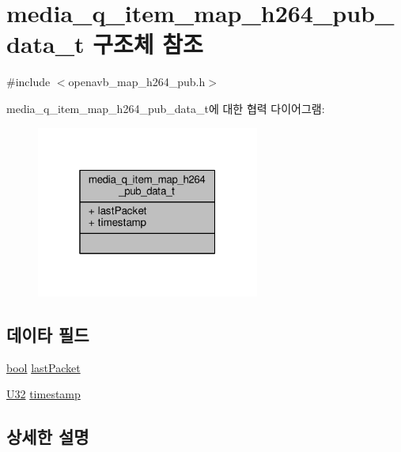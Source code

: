 \hypertarget{structmedia__q__item__map__h264__pub__data__t}{}\section{media\+\_\+q\+\_\+item\+\_\+map\+\_\+h264\+\_\+pub\+\_\+data\+\_\+t 구조체 참조}
\label{structmedia__q__item__map__h264__pub__data__t}


{\ttfamily \#include $<$openavb\+\_\+map\+\_\+h264\+\_\+pub.\+h$>$}



media\+\_\+q\+\_\+item\+\_\+map\+\_\+h264\+\_\+pub\+\_\+data\+\_\+t에 대한 협력 다이어그램\+:
\nopagebreak
\begin{figure}[H]
\begin{center}
\leavevmode
\includegraphics[width=208pt]{structmedia__q__item__map__h264__pub__data__t__coll__graph}
\end{center}
\end{figure}
\subsection*{데이타 필드}
\begin{DoxyCompactItemize}
\item 
\hyperlink{avb__gptp_8h_af6a258d8f3ee5206d682d799316314b1}{bool} \hyperlink{structmedia__q__item__map__h264__pub__data__t_aca6f99e75a0e338faed2ee8d4cbc7dd7}{last\+Packet}
\item 
\hyperlink{openavb__types__base__pub_8h_a696390429f2f3b644bde8d0322a24124}{U32} \hyperlink{structmedia__q__item__map__h264__pub__data__t_a789796b7042ad0c179aca7d160c8def8}{timestamp}
\end{DoxyCompactItemize}


\subsection{상세한 설명}


